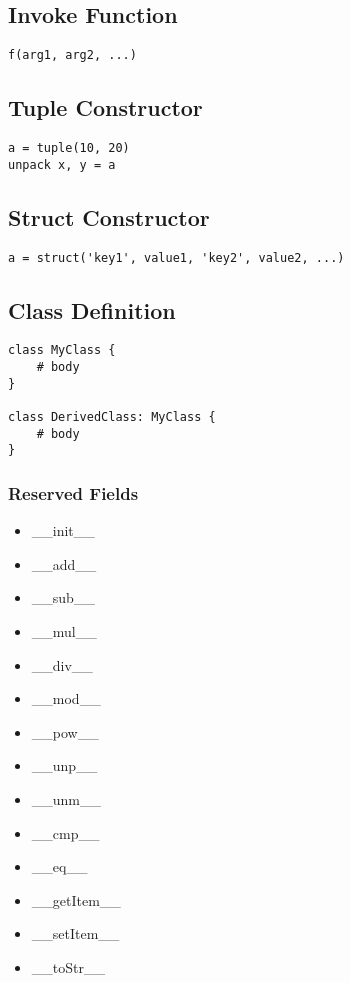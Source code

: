\documentclass[]{article}
\begin{document}
\subsection{Invoke Function}
\begin{lstlisting}
f(arg1, arg2, ...)
\end{lstlisting}

\subsection{Tuple Constructor}
\begin{lstlisting}
a = tuple(10, 20)
unpack x, y = a
\end{lstlisting}

\subsection{Struct Constructor}
\begin{lstlisting}
a = struct('key1', value1, 'key2', value2, ...)
\end{lstlisting}

\subsection{Class Definition}
\begin{lstlisting}
class MyClass {
	# body
}

class DerivedClass: MyClass {
	# body
}
\end{lstlisting}

\subsubsection{Reserved Fields}
\begin{itemize}
	\item \_\_init\_\_
	\item \_\_add\_\_
	\item \_\_sub\_\_
	\item \_\_mul\_\_
	\item \_\_div\_\_
	\item \_\_mod\_\_
	\item \_\_pow\_\_
	\item \_\_unp\_\_
	\item \_\_unm\_\_
	\item \_\_cmp\_\_
	\item \_\_eq\_\_
	\item \_\_getItem\_\_
	\item \_\_setItem\_\_
	\item \_\_toStr\_\_
\end{itemize}
\end{document}
